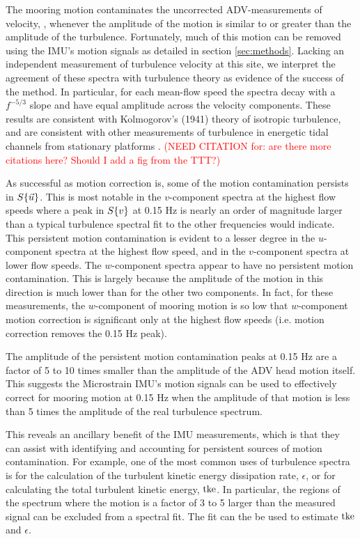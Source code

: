 \documentclass[twocol]{ametsoc}
\newcommand{\citeneeded}[1]{\textcolor{red}{(NEED CITATION for: #1)}}
\begin{document}
The mooring motion contaminates the uncorrected ADV-measurements of velocity, \spec{\umeas}, whenever the amplitude of the motion is similar to or greater than the amplitude of the turbulence. Fortunately, much of this motion can be removed using the IMU's motion signals as detailed in section \ref{sec:methods}. Lacking an independent measurement of turbulence velocity at this site, we interpret the agreement of these spectra with turbulence theory as evidence of the success of the method. In particular, for each mean-flow speed the spectra decay with a $f^{-5/3}$ slope and have equal amplitude across the velocity components. These results are consistent with Kolmogorov's (1941) theory of isotropic turbulence, and are consistent with other measurements of turbulence in energetic tidal channels from stationary platforms \citep[]{Kolmogorov1941c,Thomson++2010}.  \citeneeded{are there more citations here? Should I add a fig from the TTT?}

As successful as motion correction is, some of the motion contamination persists in $S\{\vec{u}\}$. This is most notable in the $v$-component spectra at the highest flow speeds where a peak in $S\{v\}$ at 0.15 Hz is nearly an order of magnitude larger than a typical turbulence spectral fit to the other frequencies would indicate. This persistent motion contamination is evident to a lesser degree in the $u$-component spectra at the highest flow speed, and in the $v$-component spectra at lower flow speeds.  The $w$-component spectra appear to have no persistent motion contamination. This is largely because the amplitude of the motion in this direction is much lower than for the other two components. In fact, for these measurements, the $w$-component of mooring motion is so low that $w$-component motion correction is significant only at the highest flow speeds (i.e. motion correction removes the 0.15 Hz peak).

The amplitude of the persistent motion contamination peaks at 0.15 Hz are a factor of 5 to 10 times smaller than the amplitude of the ADV head motion itself. This suggests the Microstrain IMU's motion signals can be used to effectively correct for mooring motion at 0.15 Hz when the amplitude of that motion is less than 5 times the amplitude of the real turbulence spectrum.

This reveals an ancillary benefit of the IMU measurements, which is that they can assist with identifying and accounting for persistent sources of motion contamination. For example, one of the most common uses of turbulence spectra is for the calculation of the turbulent kinetic energy dissipation rate, $\epsilon$, or for calculating the total turbulent kinetic energy, $\mathrm{tke}$. In particular, the regions of the spectrum where the motion is a factor of 3 to 5 larger than the measured signal can be excluded from a spectral fit. The fit can the be used to estimate $\mathrm{tke}$ and $\epsilon$. 
\end{document}
